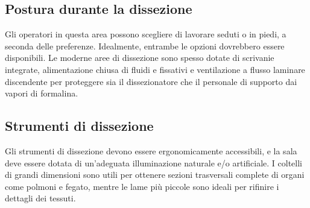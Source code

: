 
\subsection{Postura durante la dissezione}
Gli operatori in questa area possono scegliere di lavorare seduti o in piedi, a seconda delle preferenze. Idealmente, entrambe le opzioni dovrebbero essere disponibili. Le moderne aree di dissezione sono spesso dotate di scrivanie integrate, alimentazione chiusa di fluidi e fissativi e ventilazione a flusso laminare discendente per proteggere sia il dissezionatore che il personale di supporto dai vapori di formalina.

\subsection{Strumenti di dissezione}
Gli strumenti di dissezione devono essere ergonomicamente accessibili, e la sala deve essere dotata di un'adeguata illuminazione naturale e/o artificiale. I coltelli di grandi dimensioni sono utili per ottenere sezioni trasversali complete di organi come polmoni e fegato, mentre le lame più piccole sono ideali per rifinire i dettagli dei tessuti.

